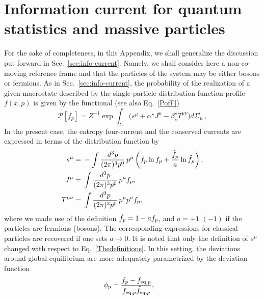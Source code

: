 \documentclass[aps,prd,preprint,nofootinbib,amsmath,amssymb,showpacs,longbibliography,singlecolumn,superscriptaddress,10pt]{revtex4-1}
\theoremstyle{plain}
\theoremstyle{definition}
\begin{document}



\section{Information current for quantum statistics and massive particles}
\label{apn:information-current-FD-BE}

For the sake of completeness, in this Appendix, we shall generalize the discussion put forward in Sec.~\ref{sec:info-current}. Namely, we shall consider here a non-co-moving reference frame and that the particles of the system may be either bosons or fermions. As in Sec.~\ref{sec:info-current}, the probability of the realization of a given macrostate described by the single-particle distribution function profile $f(x,p)$ is given by the functional (see also Eq.~\eqref{PofF})
%
\begin{equation}
\label{eq:PofF-apn}
    \mathcal{P}[f_p] = Z^{-1} \exp \int_{\Sigma} \big(s^\mu+\alpha^\star J^\mu-\beta_\nu^\star T^{\mu \nu} \big)d\Sigma_\mu \, ,
\end{equation}
In the present case, the entropy four-current and the conserved currents are expressed in terms of the distribution function by
%
\begin{equation}
\label{eq:Thedefinitions-qstat}
\begin{split}
    s^{\mu} ={}& - \int \frac{d^3p}{(2\pi)^3 p^0} \, p^{\mu} \left( f_p \ln f_p + \frac{\Tilde{f}_p}{a} \ln \Tilde{f}_p \right) , \\
    J^{\mu} ={}& \int \frac{d^3p}{(2\pi)^3 p^0} \, p^{\mu} f_p ,\\
    T^{\mu\nu} ={}& \int \frac{d^3p}{(2\pi)^3 p^0} \, p^{\mu} p^{\nu} f_p,
    \end{split}
\end{equation}
%
where we made use of the definition
$\Tilde{f}_p = 1 - a f_p$, and $a = +1$ $(-1)$ if the particles are fermions (bosons). The corresponding expressions for classical particles are recovered if one sets $a \to 0$. It is noted that only the definition of $s^{\mu}$ changed with respect to Eq.~\eqref{Thedefinitions}. In this setting, the deviations around global equilibrium are more adequately parametrized by the deviation function 
%
\begin{equation}
\begin{aligned}
&
\phi_{p} = \frac{f_{p} - f_{\mathrm{eq},p}}{f_{\mathrm{eq},p} \Tilde{f}_{\mathrm{eq},p}},
\end{aligned}    
\end{equation}
\end{document}
